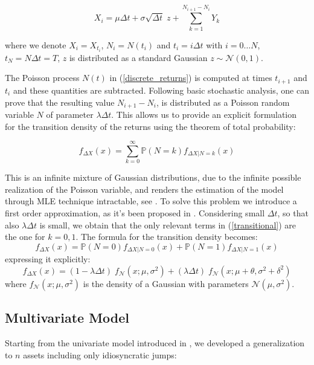 \begin{equation}
\label{discrete_returns}
X_i =  \mu \Delta t + \sigma \sqrt{\Delta t} \; z +  \sum_{k=1}^{N_{i+1} - N_i} Y_k
\end{equation}

where we denote $X_i = X_{t_i}$, $N_i = N(t_i)$ and $t_i = i \Delta t$ with $i= 0 \dots N$, $t_N = N \Delta t= T$,  $z$ is distributed as a standard Gaussian $ z\sim \mathcal{N}(0,1)$.

The Poisson process $N(t)$ in (\ref{discrete_returns}) is computed at times $t_{i+1}$ and $t_i$ and these quantities are subtracted. Following basic stochastic analysis, one can prove that the resulting value $N_{i+1} - N_i$,  is distributed as a Poisson random variable $N$ of parameter $\lambda \Delta t$.
This allows us to provide an explicit formulation for the transition density of the returns using the theorem of total probability:

\begin{equation}
\label{transitional}
f_{\Delta X} (x) = \sum_{k=0}^{\infty} \mathbb{P}(N = k) f_{\Delta X | N = k}(x) 
\end{equation}

This is an infinite mixture of Gaussian distributions, due to the infinite possible realization of the Poisson variable, and renders the estimation of the model through MLE technique intractable, see \cite{HONORE1998}.
To solve this problem we introduce a first order approximation, as it's been proposed in \cite{BALLTOROUS1983}. Considering small $\Delta t$, so that also $\lambda \Delta t $ is small, we obtain that the only relevant terms in (\ref{transitional}) are the one for $ k = 0, 1$.
The formula for the transition density becomes:
\begin{equation*}
f_{\Delta X} (x) = \mathbb{P}(N = 0) f_{\Delta X | N = 0}(x) + \mathbb{P}(N = 1) f_{\Delta X | N = 1}(x)
\end{equation*}
expressing it explicitly:
\begin{equation}
f_{\Delta X} (x) = (1 - \lambda \Delta t) \;f_{\mathcal{N}}(x ; \mu, \sigma^2) + (\lambda \Delta t)\; f_{\mathcal{N}}(x ; \mu + \theta, \sigma^2+\delta^2)
\end{equation}
where $f_{\mathcal{N}}(x ; \mu, \sigma^2)$ is the density of a Gaussian with parameters $\mathcal{N}(\mu, \sigma^2)$.


\subsection{Multivariate Model}
Starting from the univariate model introduced in \cite{MERTON1976}, we developed a generalization to $n$ assets including only idiosyncratic jumps:

